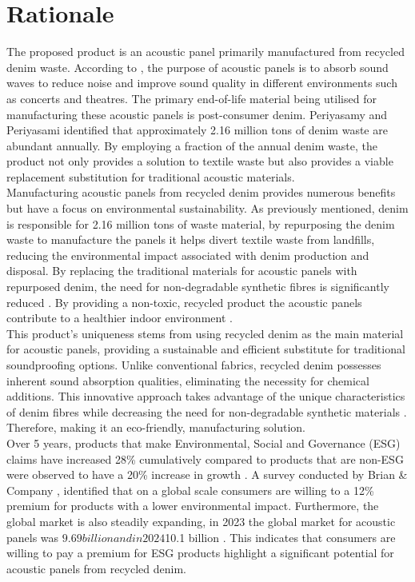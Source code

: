 \section{Rationale}
The proposed product is an acoustic panel primarily manufactured from recycled denim waste. According to \cite{EnvironmentalSustainabilityFashion}, the purpose of acoustic panels is to absorb sound waves to reduce noise and improve sound quality in different environments such as concerts and theatres. The primary end-of-life material being utilised for manufacturing these acoustic panels is post-consumer denim. Periyasamy and Periyasami \cite{CriticalReviewSustainability} identified that approximately 2.16 million tons of denim waste are abundant annually. By employing a fraction of the annual denim waste, the product not only provides a solution to textile waste but also provides a viable replacement substitution for traditional acoustic materials. \\ 
 
Manufacturing acoustic panels from recycled denim provides numerous benefits but have a focus on environmental sustainability. As previously mentioned, denim is responsible for 2.16 million tons of waste material, by repurposing the denim waste to manufacture the panels it helps divert textile waste from landfills, reducing the environmental impact associated with denim production and disposal. By replacing the traditional materials for acoustic panels with repurposed denim, the need for non-degradable synthetic fibres is significantly reduced \cite{burattiSustainablePanelsRecycled2016}. By providing a non-toxic, recycled product the acoustic panels contribute to a healthier indoor environment \cite{UltraTouchRecycledDenimb}. \\ 

This product's uniqueness stems from using recycled denim as the main material for acoustic panels, providing a sustainable and efficient substitute for traditional soundproofing options. Unlike conventional fabrics, recycled denim possesses inherent sound absorption qualities, eliminating the necessity for chemical additions. This innovative approach takes advantage of the unique characteristics of denim fibres while decreasing the need for non-degradable synthetic materials \cite{irwinFutureAcousticsEcoFriendly2024}. Therefore, making it an eco-friendly, manufacturing solution. \\ 

Over 5 years, products that make Environmental, Social and Governance (ESG) claims have increased 28\% cumulatively compared to products that are non-ESG were observed to have a 20\% increase in growth \cite{ConsumersCareSustainability}. A survey conducted by Brian \& Company \cite{VisionaryCEOGuide}, identified that on a global scale consumers are willing to a 12\% premium for products with a lower environmental impact. Furthermore, the global market is also steadily expanding, in 2023 the global market for acoustic panels was $9.69 billion and in 2024 $10.1 billion \cite{companyKeyTakeawaysArchitectural2024}. This indicates that consumers are willing to pay a premium for ESG products highlight a significant potential for acoustic panels from recycled denim. \\ 

